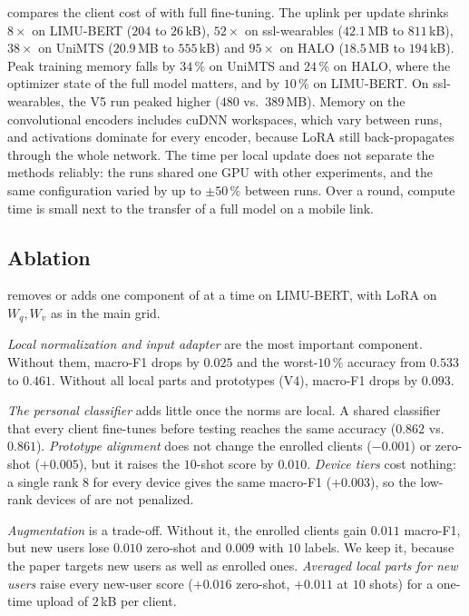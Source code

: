  compares the client cost of \method{} with full fine-tuning. The uplink per update
shrinks $8\times$ on LIMU-BERT ($204$ to $26$\,kB), $52\times$ on ssl-wearables ($42.1$\,MB to
$811$\,kB), $38\times$ on UniMTS ($20.9$\,MB to $555$\,kB) and $95\times$ on HALO ($18.5$\,MB to
$194$\,kB). Peak training memory falls by $34\,\%$ on UniMTS and $24\,\%$ on HALO, where the optimizer
state of the full model matters, and by $10\,\%$ on LIMU-BERT. On ssl-wearables, the V5 run peaked
higher ($480$ vs.\ $389$\,MB). Memory on the convolutional encoders includes cuDNN workspaces, which
vary between runs, and activations dominate for every encoder, because LoRA still back-propagates
through the whole network. The time per local update does not separate the methods reliably: the
runs shared one GPU with other experiments, and the same configuration varied by up to $\pm50\,\%$
between runs. Over a round, compute time is small next to the transfer of a full model on a mobile link.

\subsection{Ablation}\label{sec:results:ablation}

 removes or adds one component of \method{} at a time on LIMU-BERT, with LoRA on
$W_q,W_v$ as in the main grid.

\emph{Local normalization and input adapter} are the most important component. Without them,
macro-F1 drops by $0.025$ and the worst-$10\,\%$ accuracy from $0.533$ to $0.461$. Without all local
parts and prototypes (V4), macro-F1 drops by $0.093$.

\emph{The personal classifier} adds little once the norms are local. A shared classifier that every
client fine-tunes before testing reaches the same accuracy ($0.862$ vs.\ $0.861$). \emph{Prototype
alignment} does not change the enrolled clients ($-0.001$) or zero-shot ($+0.005$), but it raises the
$10$-shot score by $0.010$. \emph{Device tiers} cost nothing: a single rank $8$ for every device gives
the same macro-F1 ($+0.003$), so the low-rank devices of \method{} are not penalized.

\emph{Augmentation} is a trade-off. Without it, the enrolled clients gain $0.011$ macro-F1, but new
users lose $0.010$ zero-shot and $0.009$ with $10$ labels. We keep it, because the paper targets new
users as well as enrolled ones. \emph{Averaged local parts for new users} raise every new-user score
($+0.016$ zero-shot, $+0.011$ at $10$ shots) for a one-time upload of $2$\,kB per client.

